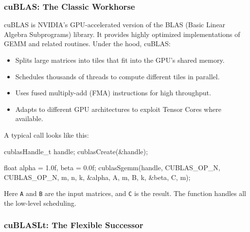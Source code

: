 \documentclass[
  letterpaper,
  DIV=11,
  numbers=noendperiod]{scrreprt}
\newenvironment{Shaded}{\begin{snugshade}}{\end{snugshade}}
\newcommand{\BuiltInTok}[1]{\textcolor[rgb]{0.00,0.23,0.31}{#1}}
\newcommand{\DataTypeTok}[1]{\textcolor[rgb]{0.68,0.00,0.00}{#1}}
\newcommand{\FloatTok}[1]{\textcolor[rgb]{0.68,0.00,0.00}{#1}}
\newcommand{\NormalTok}[1]{\textcolor[rgb]{0.00,0.23,0.31}{#1}}
\newcommand{\OperatorTok}[1]{\textcolor[rgb]{0.37,0.37,0.37}{#1}}
\providecommand{\tightlist}{%
  \setlength{\itemsep}{0pt}\setlength{\parskip}{0pt}}
\begin{document}
\subsubsection{cuBLAS: The Classic
Workhorse}\label{cublas-the-classic-workhorse}

cuBLAS is NVIDIA's GPU-accelerated version of the BLAS (Basic Linear
Algebra Subprograms) library. It provides highly optimized
implementations of GEMM and related routines. Under the hood, cuBLAS:

\begin{itemize}
\tightlist
\item
  Splits large matrices into tiles that fit into the GPU's shared
  memory.
\item
  Schedules thousands of threads to compute different tiles in parallel.
\item
  Uses fused multiply-add (FMA) instructions for high throughput.
\item
  Adapts to different GPU architectures to exploit Tensor Cores where
  available.
\end{itemize}

A typical call looks like this:

\begin{Shaded}
\begin{Highlighting}[]
\NormalTok{cublasHandle\_t handle}\OperatorTok{;}
\NormalTok{cublasCreate}\OperatorTok{(\&}\NormalTok{handle}\OperatorTok{);}

\DataTypeTok{float}\NormalTok{ alpha }\OperatorTok{=} \FloatTok{1.0}\BuiltInTok{f}\OperatorTok{,}\NormalTok{ beta }\OperatorTok{=} \FloatTok{0.0}\BuiltInTok{f}\OperatorTok{;}
\NormalTok{cublasSgemm}\OperatorTok{(}\NormalTok{handle}\OperatorTok{,}
\NormalTok{    CUBLAS\_OP\_N}\OperatorTok{,}\NormalTok{ CUBLAS\_OP\_N}\OperatorTok{,}
\NormalTok{    m}\OperatorTok{,}\NormalTok{ n}\OperatorTok{,}\NormalTok{ k}\OperatorTok{,}
    \OperatorTok{\&}\NormalTok{alpha}\OperatorTok{,}
\NormalTok{    A}\OperatorTok{,}\NormalTok{ m}\OperatorTok{,}
\NormalTok{    B}\OperatorTok{,}\NormalTok{ k}\OperatorTok{,}
    \OperatorTok{\&}\NormalTok{beta}\OperatorTok{,}
\NormalTok{    C}\OperatorTok{,}\NormalTok{ m}\OperatorTok{);}
\end{Highlighting}
\end{Shaded}

Here \texttt{A} and \texttt{B} are the input matrices, and \texttt{C} is
the result. The function handles all the low-level scheduling.

\subsubsection{cuBLASLt: The Flexible
Successor}\label{cublaslt-the-flexible-successor}
\end{document}
